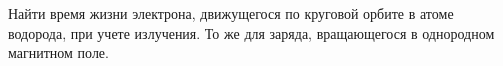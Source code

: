 \begin{tproblem}
  Найти время жизни электрона, движущегося по круговой орбите в атоме
  водорода, при учете излучения. То же для заряда, вращающегося в
  однородном магнитном поле.
\end{tproblem}
